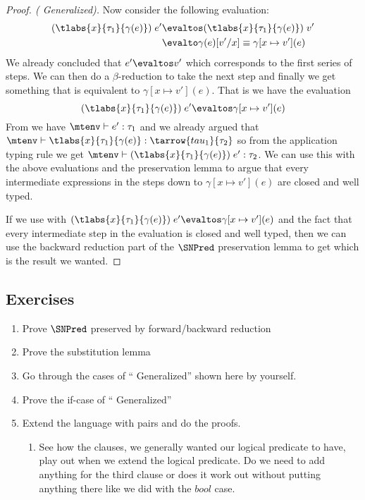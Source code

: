 \begin{proof}[Proof. ( Generalized)]
Now consider the following evaluation:
\begin{align*}
  (\tlabs{x}{\tau_1}{\gamma(e)}) \; e' & \evaltos (\tlabs{x}{\tau_1}{\gamma(e)}) \; v' \\
                                       & \evalto \gamma(e)[v'/x] \equiv 
                                                   \gamma[x \mapsto v'](e)
\end{align*}
We already concluded that $e' \evaltos v'$ which corresponds to the first series of steps. We can then do a $\beta$-reduction to take the next step and finally we get something that is equivalent to $\gamma[x \mapsto v'](e)$. That is we have the evaluation
\[
(\tlabs{x}{\tau_1}{\gamma(e)}) \; e' \evaltos \gamma[x \mapsto v'](e)
\]
From  we have $\mtenv \vdash e' : \tau_1$ and we already argued that $\mtenv \vdash \tlabs{x}{\tau_1}{\gamma(e)} : \tarrow{tau_1}{\tau_2}$ so from the application typing rule we get $\mtenv \vdash (\tlabs{x}{\tau_1}{\gamma(e)}) \; e' : \tau_2$. We can use this with the above evaluations and the preservation lemma to argue that every intermediate expressions in the steps down to $\gamma[x \mapsto v'](e)$ are closed and well typed.

If we use  with $(\tlabs{x}{\tau_1}{\gamma(e)}) \; e' \evaltos \gamma[x \mapsto v'](e)$ and the fact that every intermediate step in the evaluation is closed and well typed, then we can use the backward reduction part of the $\SNPred$ preservation lemma to get  which is the result we wanted.

\end{proof}
\subsection*{Exercises}
\begin{enumerate}
\item Prove $\SNPred$ preserved by forward/backward reduction
\item Prove the substitution lemma
\item Go through the cases of `` Generalized'' shown here by yourself.
\item Prove the if-case of `` Generalized''
\item Extend the language with pairs and do the proofs. 
  \begin{enumerate}
  \item See how the clauses, we generally wanted our logical predicate to have, play out when we extend the logical predicate. Do we need to add anything for the third clause or does it work out without putting anything there like we did with the $bool$ case.
  \end{enumerate}

\end{enumerate}
\clearpage

